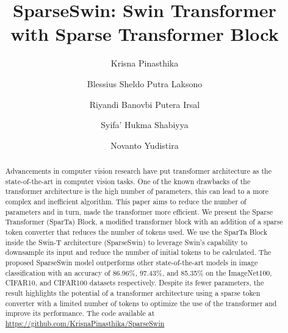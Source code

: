 \documentclass[runningheads]{llncs}
\begin{document}
\title{SparseSwin: Swin Transformer with Sparse Transformer Block}


\author{
    Krisna Pinasthika \and
    Blessius Sheldo Putra Laksono \and
    Riyandi Banovbi Putera Irsal \and
    Syifa’ Hukma Shabiyya\and
    Novanto Yudistira
}



\maketitle              \begin{abstract}
Advancements in computer vision research have put transformer architecture as the state-of-the-art in computer vision tasks. One of the known drawbacks of the transformer architecture is the high number of parameters, this can lead to a more complex and inefficient algorithm. This paper aims to reduce the number of parameters and in turn, made the transformer more efficient. We present the Sparse Transformer (SparTa) Block, a modified transformer block with an addition of a sparse token converter that reduces the number of tokens used. We use the SparTa Block inside the Swin-T architecture (SparseSwin) to leverage Swin’s capability to downsample its input and reduce the number of initial tokens to be calculated. The proposed SparseSwin model outperforms other state-of-the-art models in image classification with an accuracy of 86.96\%, 97.43\%, and 85.35\% on the ImageNet100, CIFAR10, and CIFAR100 datasets respectively. Despite its fewer parameters, the result highlights the potential of a transformer architecture using a sparse token converter with a limited number of tokens to optimize the use of the transformer and improve its performance. The code available at \url{https://github.com/KrisnaPinasthika/SparseSwin}

\end{abstract}
\end{document}
